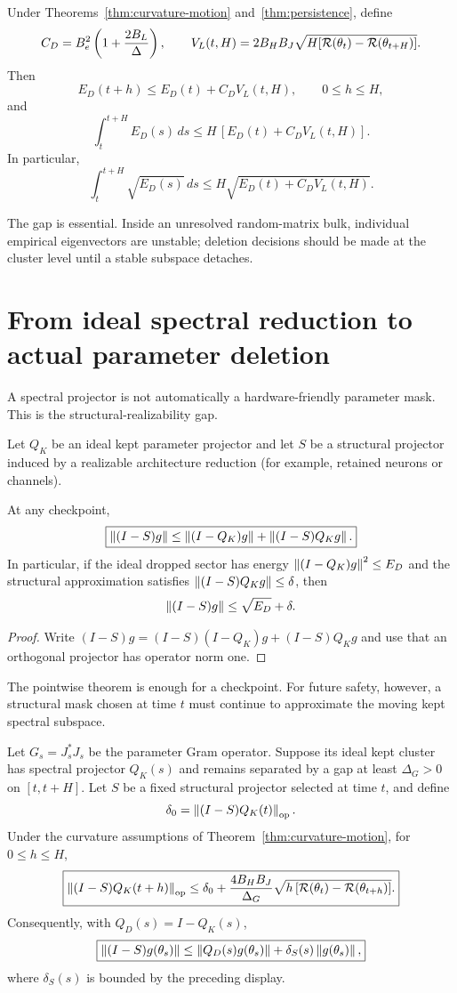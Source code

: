 \begin{corollary}\label{cor:energy-envelope}
Under Theorems~\ref{thm:curvature-motion} and~\ref{thm:persistence}, define
\[
C_D=B_e^2\left(1+\frac{2B_L}{\Delta}\right),
\qquad
V_L(t,H)=2B_HB_J\sqrt{H[\mathcal R(\theta_t)-\mathcal R(\theta_{t+H})]}.
\]
Then
\[
E_D(t+h)\le E_D(t)+C_DV_L(t,H),
\qquad 0\le h\le H,
\]
and
\[
\boxed{
\int_t^{t+H}E_D(s)\,ds
\le H\,[E_D(t)+C_DV_L(t,H)].}
\]
In particular,
\[
\int_t^{t+H}\sqrt{E_D(s)}\,ds
\le
H\sqrt{E_D(t)+C_DV_L(t,H)}.
\]
\end{corollary}

The gap is essential. Inside an unresolved random-matrix bulk, individual empirical eigenvectors are unstable; deletion decisions should be made at the cluster level until a stable subspace detaches.

\section{From ideal spectral reduction to actual parameter deletion}
A spectral projector is not automatically a hardware-friendly parameter mask. This is the structural-realizability gap.

Let $Q_K$ be an ideal kept parameter projector and let $S$ be a structural projector induced by a realizable architecture reduction (for example, retained neurons or channels).

\begin{theorem}\label{thm:structural-transfer}
At any checkpoint,
\[
\boxed{
\left\lVert (I-S)g\right\rVert
\le
\left\lVert (I-Q_K)g\right\rVert
+\left\lVert (I-S)Q_Kg\right\rVert.}
\]
In particular, if the ideal dropped sector has energy
$\left\lVert (I-Q_K)g\right\rVert^2\le E_D$ and the structural approximation satisfies
$\left\lVert (I-S)Q_Kg\right\rVert\le\delta$, then
\[
\left\lVert (I-S)g\right\rVert\le\sqrt{E_D}+\delta.
\]
\end{theorem}

\begin{proof}
Write
$(I-S)g=(I-S)(I-Q_K)g+(I-S)Q_Kg$ and use that an orthogonal projector has operator norm one.
\end{proof}

The pointwise theorem is enough for a checkpoint. For future safety, however, a structural mask chosen at time $t$ must continue to approximate the moving kept spectral subspace.

\begin{theorem}\label{thm:structural-persistence}
Let $G_s=J_s^\ast J_s$ be the parameter Gram operator. Suppose its ideal kept cluster has spectral projector $Q_K(s)$ and remains separated by a gap at least $\Delta_G>0$ on $[t,t+H]$. Let $S$ be a fixed structural projector selected at time $t$, and define
\[
\delta_0=\left\lVert (I-S)Q_K(t)\right\rVert_{\mathrm{op}}.
\]
Under the curvature assumptions of Theorem~\ref{thm:curvature-motion}, for $0\le h\le H$,
\[
\boxed{
\left\lVert (I-S)Q_K(t+h)\right\rVert_{\mathrm{op}}
\le
\delta_0
+\frac{4B_HB_J}{\Delta_G}
\sqrt{h\,[\mathcal R(\theta_t)-\mathcal R(\theta_{t+h})]}.}
\]
Consequently, with $Q_D(s)=I-Q_K(s)$,
\[
\boxed{
\left\lVert (I-S)g(\theta_s)\right\rVert
\le
\left\lVert Q_D(s)g(\theta_s)\right\rVert
+\delta_S(s)\left\lVert g(\theta_s)\right\rVert,}
\]
where $\delta_S(s)$ is bounded by the preceding display.
\end{theorem}

